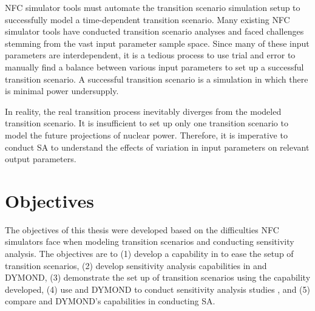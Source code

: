 \gls{NFC} simulator tools must automate the transition scenario simulation 
setup to successfully model a time-dependent transition scenario. 
Many existing \gls{NFC} simulator tools have conducted 
transition scenario analyses 
\cite{feng_standardized_2016,bae_standardized_2019,coquelet-pascal_cosi6:_2015}
and faced challenges stemming from the vast input parameter
sample space.
Since many of these input parameters are interdependent, it is 
a tedious process to use trial and error to manually find a balance 
between various input parameters to set up a successful transition 
scenario. 
A successful transition scenario is a simulation in which there 
is minimal power undersupply.
 
In reality, the real transition process inevitably diverges
from the modeled transition scenario. 
It is insufficient to set up only one transition scenario to model 
the future projections of nuclear power.
Therefore, it is imperative to conduct \gls{SA} to understand 
the effects of variation in input parameters on 
relevant output parameters. 

\section{Objectives}
The objectives of this thesis were developed based on the difficulties 
\gls{NFC} simulators face when modeling transition scenarios 
and conducting sensitivity analysis.
The objectives are to 
(1) develop a capability in \Cyclus to ease the setup of 
transition scenarios, 
(2) develop sensitivity analysis capabilities in \Cyclus and DYMOND, 
(3) demonstrate the set up of \Cyclus transition scenarios using the 
capability developed,
(4) use \Cyclus and DYMOND to conduct sensitivity analysis studies
, and
(5) compare \Cyclus and DYMOND's capabilities in conducting \gls{SA}. 
